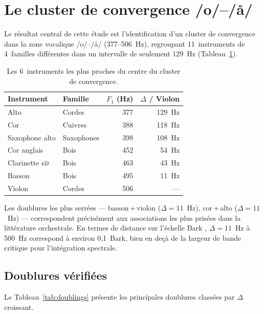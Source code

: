 \documentclass[12pt,a4paper]{article}
\begin{document}
\section{Le cluster de convergence /o/--/\aa/}

Le résultat central de cette étude est l'identification d'un cluster de convergence
dans la zone vocalique /o/--/\aa/ (377--506~Hz), regroupant 11~instruments de
4~familles différentes dans un intervalle de seulement 129~Hz
(Tableau~\ref{tab:cluster}).

\begin{table}[htbp]
\centering
\caption{Les 6~instruments les plus proches du centre du cluster de convergence.}
\label{tab:cluster}
\begin{tabular}{llrr}
\toprule
Instrument & Famille & $F_1$ (Hz) & $\Delta$ / Violon \\
\midrule
Alto         & Cordes    & 377 & 129~Hz \\
Cor          & Cuivres   & 388 & 118~Hz \\
Saxophone alto & Saxophones & 398 & 108~Hz \\
Cor anglais  & Bois      & 452 & 54~Hz \\
Clarinette si$\flat$ & Bois & 463 & 43~Hz \\
Basson       & Bois      & 495 & 11~Hz \\
Violon       & Cordes    & 506 & --- \\
\bottomrule
\end{tabular}
\end{table}

Les doublures les plus serrées --- basson\,+\,violon ($\Delta = 11$~Hz),
cor\,+\,alto ($\Delta = 11$~Hz) --- correspondent précisément aux associations les
plus prisées dans la littérature orchestrale. En termes de distance sur l'échelle
Bark \citep{Zwicker1961}, $\Delta = 11$~Hz à 500~Hz correspond à environ 0,1~Bark,
bien en deçà de la largeur de bande critique pour l'intégration spectrale.

\subsection{Doublures vérifiées}

Le Tableau~\ref{tab:doublings} présente les principales doublures classées par
$\Delta$ croissant.
\end{document}
